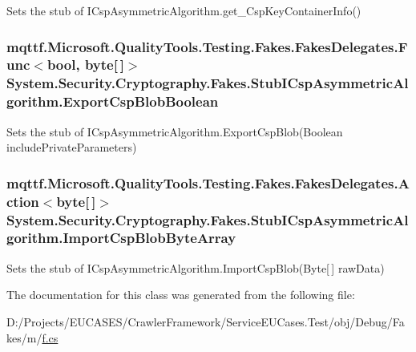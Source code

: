 Sets the stub of I\-Csp\-Asymmetric\-Algorithm.\-get\-\_\-\-Csp\-Key\-Container\-Info()

\hypertarget{class_system_1_1_security_1_1_cryptography_1_1_fakes_1_1_stub_i_csp_asymmetric_algorithm_a91f461f7327ecaf23190042620b16e7a}{
\subsubsection[{Export\-Csp\-Blob\-Boolean}]{\setlength{\rightskip}{0pt plus 5cm}mqttf.\-Microsoft.\-Quality\-Tools.\-Testing.\-Fakes.\-Fakes\-Delegates.\-Func$<$bool, byte\mbox{[}$\,$\mbox{]}$>$ System.\-Security.\-Cryptography.\-Fakes.\-Stub\-I\-Csp\-Asymmetric\-Algorithm.\-Export\-Csp\-Blob\-Boolean}}\label{class_system_1_1_security_1_1_cryptography_1_1_fakes_1_1_stub_i_csp_asymmetric_algorithm_a91f461f7327ecaf23190042620b16e7a}


Sets the stub of I\-Csp\-Asymmetric\-Algorithm.\-Export\-Csp\-Blob(\-Boolean include\-Private\-Parameters)

\hypertarget{class_system_1_1_security_1_1_cryptography_1_1_fakes_1_1_stub_i_csp_asymmetric_algorithm_a025105b61f9ea19b2d5838e2714770fd}{
\subsubsection[{Import\-Csp\-Blob\-Byte\-Array}]{\setlength{\rightskip}{0pt plus 5cm}mqttf.\-Microsoft.\-Quality\-Tools.\-Testing.\-Fakes.\-Fakes\-Delegates.\-Action$<$byte\mbox{[}$\,$\mbox{]}$>$ System.\-Security.\-Cryptography.\-Fakes.\-Stub\-I\-Csp\-Asymmetric\-Algorithm.\-Import\-Csp\-Blob\-Byte\-Array}}\label{class_system_1_1_security_1_1_cryptography_1_1_fakes_1_1_stub_i_csp_asymmetric_algorithm_a025105b61f9ea19b2d5838e2714770fd}


Sets the stub of I\-Csp\-Asymmetric\-Algorithm.\-Import\-Csp\-Blob(\-Byte\mbox{[}$\,$\mbox{]} raw\-Data)



The documentation for this class was generated from the following file\-:\begin{DoxyCompactItemize}
\item 
D\-:/\-Projects/\-E\-U\-C\-A\-S\-E\-S/\-Crawler\-Framework/\-Service\-E\-U\-Cases.\-Test/obj/\-Debug/\-Fakes/m/\hyperlink{m_2f_8cs}{f.\-cs}\end{DoxyCompactItemize}
